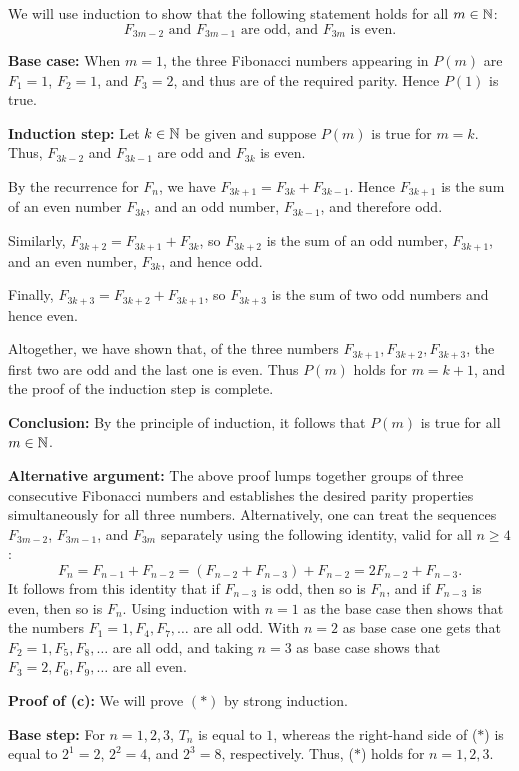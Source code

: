 We will use induction to show that the following statement 
holds for all $m\in\mathbb{N}$:
\[
\tag*{$P(m):$}
\text{
$F_{3m-2}$ and $F_{3m-1}$ are odd,
and $F_{3m}$ is even.}
\]

\textbf{Base case:} When $m=1$, the three Fibonacci numbers appearing in 
$P(m)$ are $F_1=1$, $F_2=1$, and $F_3=2$, and thus are of the required
parity. Hence $P(1)$ is true.

\textbf{Induction step:} Let $k\in\mathbb{N}$ be given and suppose 
$P(m)$ is true for $m=k$. Thus, $F_{3k-2}$ and $F_{3k-1}$ are odd and 
$F_{3k}$ is even.

By the recurrence for $F_n$, we have $F_{3k+1}=F_{3k}+F_{3k-1}$. Hence
$F_{3k+1}$ is the sum of an even number $F_{3k}$, and an odd number,
$F_{3k-1}$, and therefore odd. 

Similarly, $F_{3k+2}=F_{3k+1}+F_{3k}$, so $F_{3k+2}$ is the sum of an odd
number, $F_{3k+1}$, and an even number, $F_{3k}$, and hence odd.

Finally, $F_{3k+3}=F_{3k+2}+F_{3k+1}$, so $F_{3k+3}$ is the sum of two odd
numbers and hence even. 

Altogether, we have shown that, of the three numbers
$F_{3k+1},F_{3k+2},F_{3k+3}$, the first two are odd and the last one is
even. Thus $P(m)$ holds for $m=k+1$, and the proof of the 
induction step is complete. 

\textbf{Conclusion:} By the principle of induction,  it follows that
$P(m)$ is true for all $m\in\mathbb{N}$.  

\bigskip

\textbf{Alternative argument:} The above proof lumps together groups of
three consecutive Fibonacci numbers and establishes the desired parity
properties simultaneously for all three numbers.  
Alternatively, one can treat the sequences $F_{3m-2}$, $F_{3m-1}$, and
$F_{3m}$ separately using  the following identity, valid for 
all $n\ge4$:
\[
F_{n}=F_{n-1}+F_{n-2}=(F_{n-2}+F_{n-3})+F_{n-2}=2F_{n-2}+F_{n-3}.
\]
It follows from this identity that if $F_{n-3}$ is odd, then so is $F_{n}$,
and if $F_{n-3}$ is even, then so is $F_n$.  Using 
induction with $n=1$ as the base case then shows that the numbers
$F_1=1,F_4,F_7,\dots$ are all odd.  With $n=2$ as base case one gets that 
$F_2=1,F_5,F_8,\dots$ are all odd, and taking $n=3$ as base case 
shows that $F_3=2,F_6,F_9,\dots$ are all even.


\textbf{Proof of (c):}
We will prove $(*)$ by strong induction.

\textbf{Base step:} 
For $n=1,2,3$, $T_n$ is equal to $1$, whereas the
right-hand side of ($*$) is equal to $2^1=2$, $2^2=4$, and $2^3=8$,
respectively. Thus, ($*$) holds for $n=1,2,3$.

